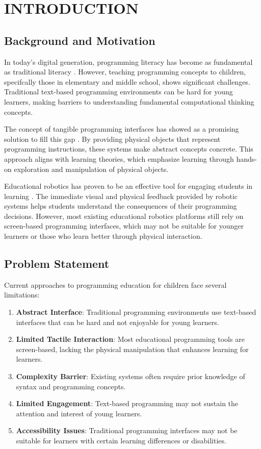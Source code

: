 \chapter{INTRODUCTION}

\section{Background and Motivation}

In today's digital generation, programming literacy has become as fundamental as traditional literacy \cite{wing2006computational}. However, teaching programming concepts to children, specifcally those in elementary and middle school, shows significant challenges. Traditional text-based programming environments can be hard for young learners, making barriers to understanding fundamental computational thinking concepts.

The concept of tangible programming interfaces has showed as a promising solution to fill this gap \cite{ishii2008tangible}. By providing physical objects that represent programming instructions, these systems make abstract concepts concrete. This approach aligns with learning theories, which emphasize learning through hands-on exploration and manipulation of physical objects.

Educational robotics has proven to be an effective tool for engaging students in learning \cite{benitti2012exploring}. The immediate visual and physical feedback provided by robotic systems helps students understand the consequences of their programming decisions. However, most existing educational robotics platforms still rely on screen-based programming interfaces, which may not be suitable for younger learners or those who learn better through physical interaction.

\section{Problem Statement}

Current approaches to programming education for children face several limitations:

\begin{enumerate}
    \item \textbf{Abstract Interface}: Traditional programming environments use text-based interfaces that can be hard and not enjoyable for young learners.
    \item \textbf{Limited Tactile Interaction}: Most educational programming tools are screen-based, lacking the physical manipulation that enhances learning for  learners.
    \item \textbf{Complexity Barrier}: Existing systems often require prior knowledge of syntax and programming concepts.
    \item \textbf{Limited Engagement}: Text-based programming may not sustain the attention and interest of young learners.
    \item \textbf{Accessibility Issues}: Traditional programming interfaces may not be suitable for learners with certain learning differences or disabilities.
\end{enumerate}

